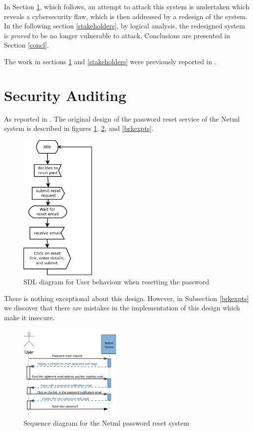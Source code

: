 In Section \ref{secadit}, which follows, an attempt to attack this system is undertaken which reveals a cybersecurity flaw, which is then addressed by a redesign of the system. In the following section \ref{stakeholders}, by logical analysis, the redesigned system is {\em proved} to be no longer vulnerable to attack. Conclusions are presented in Section \ref{concl}. 

The work in sections \ref{secadit} and \ref{stakeholders} were previously reported in \cite{sheniar2018experiments}.


\section{Security Auditing}\label{secadit}

As reported in \cite{sheniar2018experiments}. The original design of the password reset
service of the Netml system is described in figures \ref{usersdl}, \ref{seqdgnetmlorg}, and \ref{brkexpts}.
\begin{figure}
\begin{center}
\vspace{5mm}
\includegraphics[width=37mm]{figures/resetpwd.png}
\caption{SDL diagram for User behaviour when resetting the password}
\label{usersdl}
\end{center}
\end{figure}

There is nothing exceptional about this design. However, in Subsection \ref{brkexpts}
we discover that there are mistakes in the implementation of this design which
make it insecure.

\begin{figure}
	\centering
		\includegraphics[width=5cm]{figures/User.png}
\caption{Sequence diagram for the Netml password reset  system }
\label{seqdgnetmlorg}
\end{figure}
	

